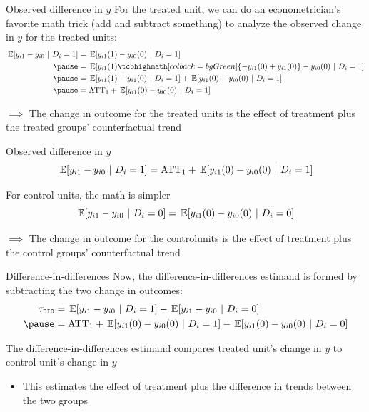\documentclass[aspectratio=169,t,11pt,table]{beamer}
\begin{document}
\begin{frame}{Observed difference in $y$}
  For the treated unit, we can do an econometrician's favorite math trick (add and subtract something) to analyze the observed change in $y$ for the treated units:
  \begin{align*}
    \expec{y_{i1} - y_{i0}}{D_i = 1} 
    &= \expec{y_{i1}(1) - y_{i0}(0)}{D_i = 1} \\
    \pause
    &= \expec{y_{i1}(1) \tcbhighmath[colback = bgGreen]{- y_{i1}(0) + y_{i1}(0)} - y_{i0}(0)}{D_i = 1} \\
    \pause
    &= \expec{y_{i1}(1) - y_{i1}(0)}{D_i = 1} + \expec{y_{i1}(0) - y_{i0}(0)}{D_i = 1} \\
    \pause
    &= \text{ATT}_1 + \expec{y_{i1}(0) - y_{i0}(0)}{D_i = 1}
  \end{align*}

  \medskip 
  $\implies$ The change in outcome for the treated units is the effect of treatment plus the treated groups' counterfactual trend
\end{frame}

\begin{frame}{Observed difference in $y$}
  \vspace*{-\bigskipamount}
  $$
    \expec{y_{i1} - y_{i0}}{D_i = 1} = \text{ATT}_1 + \expec{y_{i1}(0) - y_{i0}(0)}{D_i = 1}
  $$

  \bigskip\bigskip
  For control units, the math is simpler 
  $$
    \expec{y_{i1} - y_{i0}}{D_i = 0} = \expec{y_{i1}(0) - y_{i0}(0)}{D_i = 0}
  $$

  \medskip
  $\implies$ The change in outcome for the controlunits is the effect of treatment plus the control groups' counterfactual trend 
\end{frame}

\begin{frame}{Difference-in-differences}
  Now, the difference-in-differences estimand is formed by subtracting the two change in outcomes:
  \begin{align*}
    \tau_{\texttt{DID}} &= \expec{y_{i1} - y_{i0}}{D_i = 1} - \expec{y_{i1} - y_{i0}}{D_i = 0}  \\ 
    \pause
    &= \text{ATT}_1 + \expec{y_{i1}(0) - y_{i0}(0)}{D_i = 1} - \expec{y_{i1}(0) - y_{i0}(0)}{D_i = 0}
  \end{align*}

  \bigskip
  The difference-in-differences estimand compares treated unit's change in $y$ to control unit's change in $y$
  \begin{itemize}
    \item This estimates the effect of treatment plus the difference in trends between the two groups
  \end{itemize}
\end{frame}
\end{document}
